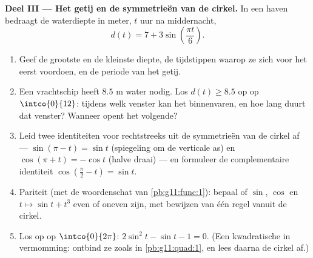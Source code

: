 \begin{problem}
\medskip
\noindent\textbf{Deel III --- Het getij en de symmetrieën van de cirkel.}
In een haven bedraagt de waterdiepte in meter, $t$ uur na middernacht,
\[
d(t) = 7 + 3 \sin\!\left(\frac{\pi t}{6}\right).
\]
\begin{enumerate}[resume]
  \item Geef de grootste en de kleinste diepte, de tijdstippen waarop ze
        zich voor het eerst voordoen, en de periode van het getij.
  \item Een vrachtschip heeft $8.5$ m water nodig. Los $d(t) \geq 8.5$ op op
        $\intco{0}{12}$: tijdens welk venster kan het binnenvaren, en hoe
        lang duurt dat venster? Wanneer opent het volgende?
  \item Leid twee identiteiten voor  rechtstreeks uit de
        symmetrieën van de cirkel af --- $\sin(\pi - t) = \sin t$ (spiegeling
        om de verticale as) en $\cos(\pi + t) = -\cos t$ (halve draai) --- en
        formuleer de complementaire identiteit
        $\cos\left(\frac\pi2 - t\right) = \sin t$.
  \item Pariteit (met de woordenschat van \cref{pb:g11:func:1}): bepaal of
        $\sin$, $\cos$ en $t \mapsto \sin t + t^3$ even of oneven zijn, met
        bewijzen van één regel vanuit de cirkel.
  \item Los op op $\intco{0}{2\pi}$: $2\sin^2 t - \sin t - 1 = 0$. (Een
        kwadratische  in vermomming: ontbind ze zoals in
        \cref{pb:g11:quad:1}, en lees daarna de cirkel af.)
\end{enumerate}


\end{problem}
